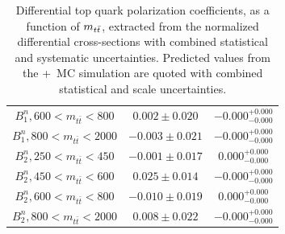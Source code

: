 \begin{table}[htb]
\begin{tabular}{c | c c}
$B_{1}^{n}, {600 < m_{t\bar{t}} < 800}$ & $0.002 \pm 0.020$ & $-0.000^{+0.000}_{-0.000}$ \\
$B_{1}^{n}, {800 < m_{t\bar{t}} < 2000}$ & $-0.003 \pm 0.021$ & $-0.000^{+0.000}_{-0.000}$ \\
$B_{2}^{n}, {250 < m_{t\bar{t}} < 450}$ & $-0.001 \pm 0.017$ & $0.000^{+0.000}_{-0.000}$ \\
$B_{2}^{n}, {450 < m_{t\bar{t}} < 600}$ & $0.025 \pm 0.014$ & $-0.000^{+0.000}_{-0.000}$ \\
$B_{2}^{n}, {600 < m_{t\bar{t}} < 800}$ & $-0.010 \pm 0.019$ & $0.000^{+0.000}_{-0.000}$ \\
$B_{2}^{n}, {800 < m_{t\bar{t}} < 2000}$ & $0.008 \pm 0.022$ & $-0.000^{+0.000}_{-0.000}$ \\
\hline
\end{tabular}
    \caption{
    Differential top quark polarization coefficients, as a function of $m_{t\bar{t}}$, extracted from the normalized differential cross-sections with combined statistical and systematic uncertainties. 
    Predicted values from the \Powheg+\Pythia\ MC simulation are quoted with combined statistical and scale uncertainties.
    }
    \label{tab:Extracted_Coefficients_2D_Polarizations}
\end{table}

